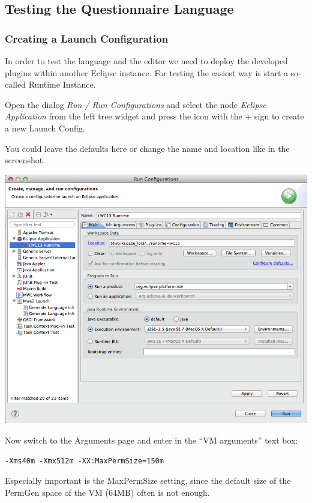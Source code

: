 \subsection{Testing the Questionnaire Language} \label{sec:TestingQL}

\subsubsection{Creating a Launch Configuration}

In order to test the language and the editor we need to deploy the developed
plugins within another Eclipse instance. For testing the easiest way is start a
so-called Runtime Instance.

Open the dialog \emph{Run / Run Configurations} and select the node \emph{Eclipse
Application} from the left tree widget and press the icon with the +
sign to create a new Launch Config.

You could leave the defaults here or change the name and location like in the
screenshot.

\includegraphics[width=17cm]{./images/chapter01/LaunchConfig.png}

Now switch to the Arguments page and enter in the ``VM arguments'' text box:
\begin{lstlisting}
-Xms40m -Xmx512m -XX:MaxPermSize=150m
\end{lstlisting}
Especially important is the MaxPermSize setting, since the default size of the
PermGen space of the VM (64MB) often is not enough.

